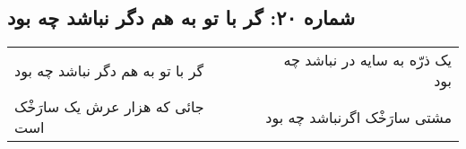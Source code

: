 \begin{center}
\section*{شماره ۲۰: گر با تو به هم دگر نباشد چه بود}
\label{sec:020}
\begin{longtable}{l p{0.5cm} r}
گر با تو به هم دگر نباشد چه بود
&&
یک ذرّه به سایه در نباشد چه بود
\\
جائی که هزار عرش یک سارَخْک است
&&
مشتی سارَخْک اگرنباشد چه بود
\\
\end{longtable}
\end{center}
